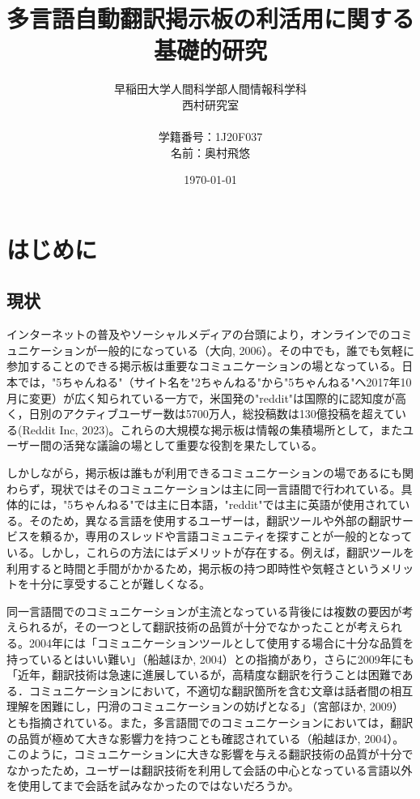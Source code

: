 \documentclass[b5paper,12pt]{jsreport}
\title{多言語自動翻訳掲示板の利活用に関する基礎的研究}
\author{早稲田大学人間科学部人間情報科学科\\
西村研究室\\
\\
学籍番号：1J20F037\\
名前：奥村飛悠}
\date{\today}
\begin{document}
\maketitle
\tableofcontents

\chapter{はじめに}

\section{現状}

インターネットの普及やソーシャルメディアの台頭により，オンラインでのコミュニケーションが一般的になっている（大向, 2006）。その中でも，誰でも気軽に参加することのできる掲示板は重要なコミュニケーションの場となっている。日本では，"5ちゃんねる"（サイト名を"2ちゃんねる"から"5ちゃんねる"へ2017年10月に変更）が広く知られている一方で，米国発の"reddit"は国際的に認知度が高く，日別のアクティブユーザー数は5700万人，総投稿数は130億投稿を超えている(Reddit Inc, 2023)。これらの大規模な掲示板は情報の集積場所として，またユーザー間の活発な議論の場として重要な役割を果たしている。

しかしながら，掲示板は誰もが利用できるコミュニケーションの場であるにも関わらず，現状ではそのコミュニケーションは主に同一言語間で行われている。具体的には，"5ちゃんねる"では主に日本語，"reddit"では主に英語が使用されている。そのため，異なる言語を使用するユーザーは，翻訳ツールや外部の翻訳サービスを頼るか，専用のスレッドや言語コミュニティを探すことが一般的となっている。しかし，これらの方法にはデメリットが存在する。例えば，翻訳ツールを利用すると時間と手間がかかるため，掲示板の持つ即時性や気軽さというメリットを十分に享受することが難しくなる。

同一言語間でのコミュニケーションが主流となっている背後には複数の要因が考えられるが，その一つとして翻訳技術の品質が十分でなかったことが考えられる。2004年には「コミュニケーションツールとして使用する場合に十分な品質を持っているとはいい難い」（船越ほか, 2004）との指摘があり，さらに2009年にも「近年，翻訳技術は急速に進展しているが，高精度な翻訳を行うことは困難である．コミュニケーションにおいて，不適切な翻訳箇所を含む文章は話者間の相互理解を困難にし，円滑のコミュニケーションの妨げとなる」（宮部ほか, 2009）とも指摘されている。また，多言語間でのコミュニケーションにおいては，翻訳の品質が極めて大きな影響力を持つことも確認されている（船越ほか, 2004）。このように，コミュニケーションに大きな影響を与える翻訳技術の品質が十分でなかったため，ユーザーは翻訳技術を利用して会話の中心となっている言語以外を使用してまで会話を試みなかったのではないだろうか。
\end{document}
